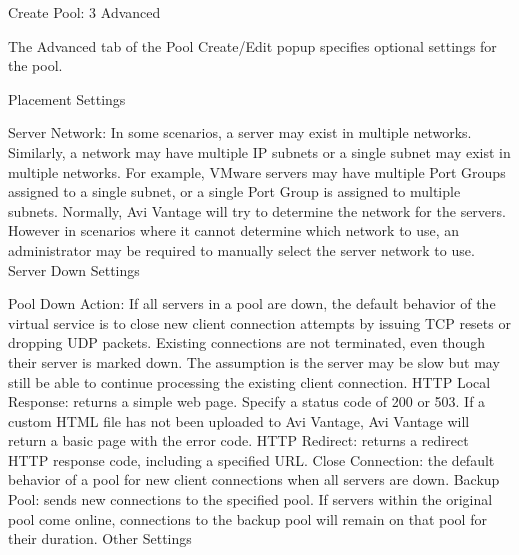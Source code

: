 \documentclass[letterpaper,10pt,english]{sphinxmanual}
\begin{document}
Create Pool: 3 Advanced

The Advanced tab of the Pool Create/Edit popup specifies optional settings for the pool.

Placement Settings

Server Network: In some scenarios, a server may exist in multiple networks. Similarly, a network may have multiple IP subnets or a single subnet may exist in multiple networks. For example, VMware servers may have multiple Port Groups assigned to a single subnet, or a single Port Group is assigned to multiple subnets. Normally, Avi Vantage will try to determine the network for the servers. However in scenarios where it cannot determine which network to use, an administrator may be required to manually select the server network to use.
Server Down Settings

Pool Down Action: If all servers in a pool are down, the default behavior of the virtual service is to close new client connection attempts by issuing TCP resets or dropping UDP packets. Existing connections are not terminated, even though their server is marked down. The assumption is the server may be slow but may still be able to continue processing the existing client connection.
HTTP Local Response: returns a simple web page. Specify a status code of 200 or 503. If a custom HTML file has not been uploaded to Avi Vantage, Avi Vantage will return a basic page with the error code.
HTTP Redirect: returns a redirect HTTP response code, including a specified URL.
Close Connection: the default behavior of a pool for new client connections when all servers are down.
Backup Pool: sends new connections to the specified pool. If servers within the original pool come online, connections to the backup pool will remain on that pool for their duration.
Other Settings
\end{document}
